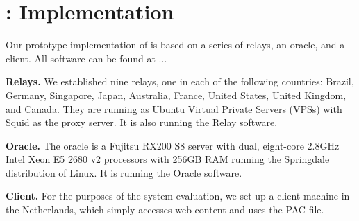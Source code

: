 \section{\system{}: Implementation}
Our prototype implementation of \system{} is based on a series of relays, an oracle, and 
a client. All \system{} software can be found at ... 

{\bf Relays.}  We established nine relays, one in each of the following countries: Brazil, 
Germany, Singapore, Japan, Australia, France, United States, United Kingdom, and Canada.  
They are running as Ubuntu Virtual Private Servers (VPSs) with 
Squid as the proxy server.  It is also running the \system{} Relay software.

{\bf Oracle.}  The oracle is a Fujitsu RX200 S8 server with dual, 
eight-core 2.8GHz Intel Xeon E5 2680 v2 processors with 256GB RAM running the 
Springdale distribution of Linux. It is running the \system{} Oracle software.

{\bf Client.} For the purposes of the system evaluation, we set up a client 
machine in the Netherlands, which simply accesses web content and uses the PAC 
file.
